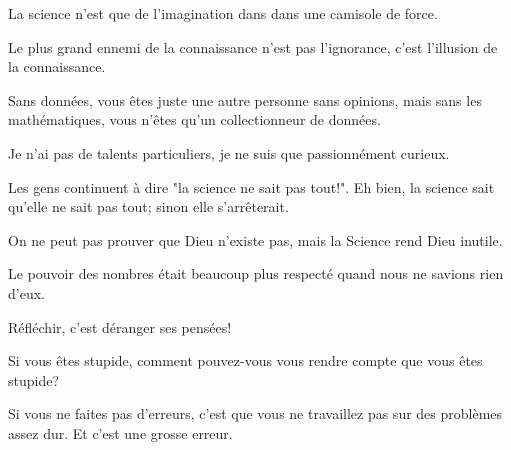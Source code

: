 \documentclass[12pt,a4paper,twoside,openright]{report}
\theoremstyle{definition}
\theoremstyle{itexmp}
\numberwithin{equation}{section}
\begin{document}
 	 \begin{fquote}La science n'est que de l'imagination dans dans une camisole de force.
 	\end{fquote}
 	
 	 \begin{fquote}Le plus grand ennemi de la connaissance n'est pas l'ignorance, c'est l'illusion de la connaissance.
 	\end{fquote}
 	
 	 \begin{fquote}[?]Sans données, vous êtes juste une autre personne sans opinions, mais sans les mathématiques, vous n'êtes qu'un collectionneur de données.
 	\end{fquote}
 	
 	\begin{fquote}Je n'ai pas de talents particuliers, je ne suis que passionnément curieux.
 	\end{fquote}

	\begin{fquote}Les gens continuent à dire "la science ne sait pas tout!". Eh bien, la science sait qu'elle ne sait pas tout; sinon elle s'arrêterait.
 	\end{fquote}
 

 	 \begin{fquote}On ne peut pas prouver que Dieu n'existe pas, mais la Science rend Dieu inutile.
 	\end{fquote}

 	 \begin{fquote}[Voltaire]Le pouvoir des nombres était beaucoup plus respecté quand nous ne savions rien d'eux.
 	\end{fquote}

	\begin{fquote}Réfléchir, c'est déranger ses pensées!
 	\end{fquote} 
 	
 	\begin{fquote}Si vous êtes stupide, comment pouvez-vous vous rendre compte que vous êtes stupide?
 	\end{fquote} 	
 	
 	\begin{fquote}Si vous ne faites pas d'erreurs, c'est que vous ne travaillez pas sur des problèmes assez dur. Et c'est une grosse erreur.
 	\end{fquote}
\end{document}
